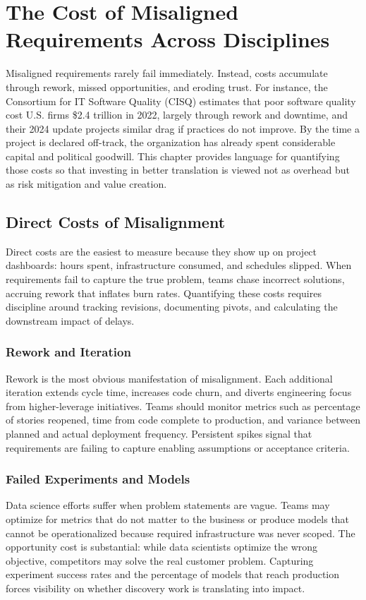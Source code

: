 \chapter{The Cost of Misaligned Requirements Across Disciplines}
\label{ch:misalignment-costs}

Misaligned requirements rarely fail immediately. Instead, costs accumulate through rework, missed opportunities, and eroding trust. For instance, the Consortium for IT Software Quality (CISQ) estimates that poor software quality cost U.S. firms \$2.4 trillion in 2022, largely through rework and downtime, and their 2024 update projects similar drag if practices do not improve. By the time a project is declared off-track, the organization has already spent considerable capital and political goodwill. This chapter provides language for quantifying those costs so that investing in better translation is viewed not as overhead but as risk mitigation and value creation.

\section{Direct Costs of Misalignment}
\label{sec:direct-costs}

Direct costs are the easiest to measure because they show up on project dashboards: hours spent, infrastructure consumed, and schedules slipped. When requirements fail to capture the true problem, teams chase incorrect solutions, accruing rework that inflates burn rates. Quantifying these costs requires discipline around tracking revisions, documenting pivots, and calculating the downstream impact of delays.

\subsection{Rework and Iteration}
Rework is the most obvious manifestation of misalignment. Each additional iteration extends cycle time, increases code churn, and diverts engineering focus from higher-leverage initiatives. Teams should monitor metrics such as percentage of stories reopened, time from code complete to production, and variance between planned and actual deployment frequency. Persistent spikes signal that requirements are failing to capture enabling assumptions or acceptance criteria.

\subsection{Failed Experiments and Models}
Data science efforts suffer when problem statements are vague. Teams may optimize for metrics that do not matter to the business or produce models that cannot be operationalized because required infrastructure was never scoped. The opportunity cost is substantial: while data scientists optimize the wrong objective, competitors may solve the real customer problem. Capturing experiment success rates and the percentage of models that reach production forces visibility on whether discovery work is translating into impact.

